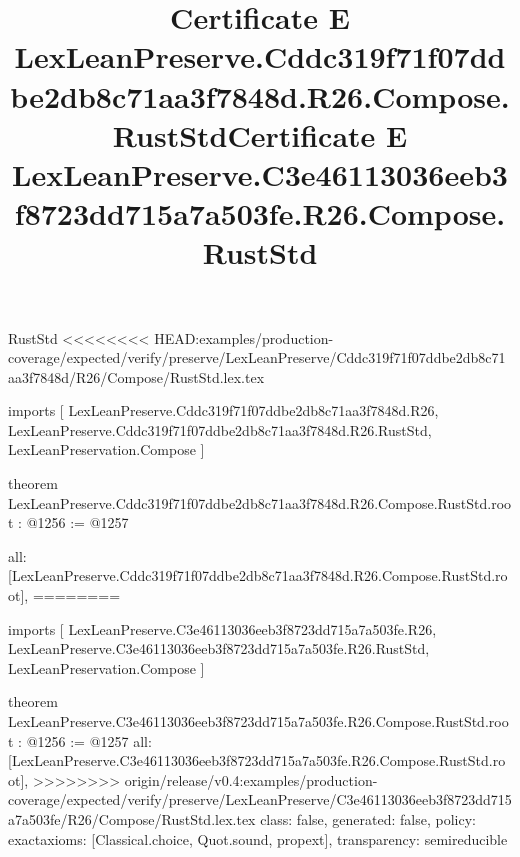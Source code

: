 \begin{lexlean}{RustStd}
<<<<<<<< HEAD:examples/production-coverage/expected/verify/preserve/LexLeanPreserve/Cddc319f71f07ddbe2db8c71aa3f7848d/R26/Compose/RustStd.lex.tex
\title{Certificate E LexLeanPreserve.Cddc319f71f07ddbe2db8c71aa3f7848d.R26.Compose.RustStd}
\begin{coremodule}
imports [
  LexLeanPreserve.Cddc319f71f07ddbe2db8c71aa3f7848d.R26,
  LexLeanPreserve.Cddc319f71f07ddbe2db8c71aa3f7848d.R26.RustStd,
  LexLeanPreservation.Compose
]

theorem LexLeanPreserve.Cddc319f71f07ddbe2db8c71aa3f7848d.R26.Compose.RustStd.root : @1256 := @1257 {
  all: [LexLeanPreserve.Cddc319f71f07ddbe2db8c71aa3f7848d.R26.Compose.RustStd.root],
========
\title{Certificate E LexLeanPreserve.C3e46113036eeb3f8723dd715a7a503fe.R26.Compose.RustStd}
\begin{coremodule}
imports [
  LexLeanPreserve.C3e46113036eeb3f8723dd715a7a503fe.R26,
  LexLeanPreserve.C3e46113036eeb3f8723dd715a7a503fe.R26.RustStd,
  LexLeanPreservation.Compose
]

theorem LexLeanPreserve.C3e46113036eeb3f8723dd715a7a503fe.R26.Compose.RustStd.root : @1256 := @1257 {
  all: [LexLeanPreserve.C3e46113036eeb3f8723dd715a7a503fe.R26.Compose.RustStd.root],
>>>>>>>> origin/release/v0.4:examples/production-coverage/expected/verify/preserve/LexLeanPreserve/C3e46113036eeb3f8723dd715a7a503fe/R26/Compose/RustStd.lex.tex
  class: false,
  generated: false,
  policy: exact{axioms: [Classical.choice, Quot.sound, propext]},
  transparency: semireducible
}


\end{coremodule}}
\end{coremodule}
\end{lexlean}
